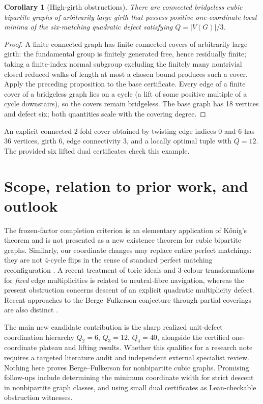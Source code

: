 \documentclass[11pt]{article}
\newtheorem{corollary}[theorem]{Corollary}
\begin{document}
\begin{corollary}[High-girth obstructions]
There are connected bridgeless cubic bipartite graphs of
arbitrarily large girth that possess positive one-coordinate
local minima of the six-matching quadratic defect satisfying
$Q=|V(G)|/3$.
\end{corollary}
\begin{proof}
A finite connected graph has finite connected covers of
arbitrarily large girth: the fundamental group is finitely
generated free, hence residually finite; taking a finite-index
normal subgroup excluding the finitely many nontrivial closed
reduced walks of length at most a chosen bound produces such
a cover. Apply the preceding proposition to the base certificate.
Every edge of a finite cover of a bridgeless graph lies on a
cycle (a lift of some positive multiple of a cycle downstairs),
so the covers remain bridgeless. The base graph has 18 vertices
and defect six; both quantities scale with the covering degree.
\end{proof}

An explicit connected $2$-fold cover obtained by twisting
edge indices $0$ and $6$ has $36$ vertices, girth $6$, edge
connectivity $3$, and a locally optimal tuple with $Q=12$.
The provided six lifted dual certificates check this example.

\section{Scope, relation to prior work, and outlook}
The frozen-factor completion criterion is an elementary
application of K\H onig's theorem and is not presented as a
new existence theorem for cubic bipartite graphs. Similarly,
our coordinate changes may replace entire perfect matchings:
they are not 4-cycle flips in the sense of standard perfect
matching reconfiguration \cite{Bonamy2019}. A recent treatment
of toric ideals and $3$-colour transformations for \emph{fixed}
edge multiplicities \cite{Mori2026} is related to neutral-fibre
navigation, whereas the present obstruction concerns descent of
an explicit quadratic multiplicity defect. Recent approaches to
the Berge--Fulkerson conjecture through partial coverings are
also distinct \cite{Luo2026}.

The main new candidate contribution is the sharp realized
unit-defect coordination hierarchy $Q_2=6$, $Q_3=12$, $Q_4=40$,
alongside the certified one-coordinate plateau and lifting results.
Whether this qualifies for a research note requires a targeted
literature audit and independent external specialist review.
Nothing here proves Berge--Fulkerson for nonbipartite cubic graphs.
Promising follow-ups include determining the minimum coordinate
width for strict descent in nonbipartite graph classes, and
using small dual certificates as Lean-checkable obstruction witnesses.
\end{document}
